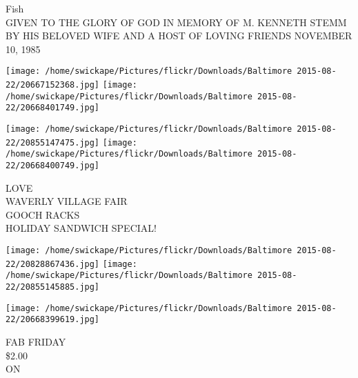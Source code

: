 \documentclass[10pt,letterpaper]{article}
\begin{document}
Fish\\
GIVEN TO THE GLORY OF GOD IN MEMORY OF M. KENNETH STEMM BY HIS BELOVED WIFE AND A HOST OF LOVING FRIENDS NOVEMBER 10, 1985\\
\pagebreak

\texttt{[image: /home/swickape/Pictures/flickr/Downloads/Baltimore 2015-08-22/20667152368.jpg]}
\texttt{[image: /home/swickape/Pictures/flickr/Downloads/Baltimore 2015-08-22/20668401749.jpg]}

\texttt{[image: /home/swickape/Pictures/flickr/Downloads/Baltimore 2015-08-22/20855147475.jpg]}
\texttt{[image: /home/swickape/Pictures/flickr/Downloads/Baltimore 2015-08-22/20668400749.jpg]}

LOVE\\
WAVERLY VILLAGE FAIR\\
GOOCH RACKS\\
HOLIDAY SANDWICH SPECIAL!\\
\pagebreak

\texttt{[image: /home/swickape/Pictures/flickr/Downloads/Baltimore 2015-08-22/20828867436.jpg]}
\texttt{[image: /home/swickape/Pictures/flickr/Downloads/Baltimore 2015-08-22/20855145885.jpg]}

\texttt{[image: /home/swickape/Pictures/flickr/Downloads/Baltimore 2015-08-22/20668399619.jpg]}

FAB FRIDAY\\
\$2.00\\
ON\\
\pagebreak
\end{document}
